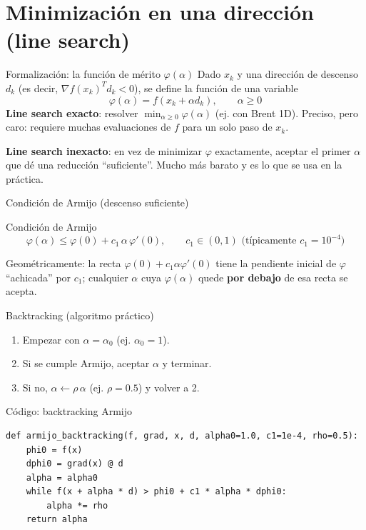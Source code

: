 \documentclass[aspectratio=169]{beamer}
\newcommand{\grad}{\nabla}
\begin{document}
\section{Minimizaci\'on en una direcci\'on (line search)}

\begin{frame}{Formalizaci\'on: la funci\'on de m\'erito $\varphi(\alpha)$}
  Dado $x_k$ y una direcci\'on de descenso $d_k$ (es decir, $\grad f(x_k)^T d_k < 0$), se define la funci\'on de una variable
  \[ \varphi(\alpha) = f(x_k + \alpha d_k), \qquad \alpha \geq 0 \]
  \textbf{Line search exacto}: resolver $\min_{\alpha \geq 0} \varphi(\alpha)$ (ej. con Brent 1D). Preciso, pero caro: requiere muchas evaluaciones de $f$ para un solo paso de $x_k$.

  \textbf{Line search inexacto}: en vez de minimizar $\varphi$ exactamente, aceptar el primer $\alpha$ que d\'e una reducci\'on ``suficiente''. Mucho m\'as barato y es lo que se usa en la pr\'actica.
\end{frame}

\begin{frame}{Condici\'on de Armijo (descenso suficiente)}
  \begin{block}{Condici\'on de Armijo}
    \[ \varphi(\alpha) \leq \varphi(0) + c_1\,\alpha\,\varphi'(0), \qquad c_1 \in (0,1) \text{ (t\'ipicamente } c_1=10^{-4}\text{)} \]
  \end{block}
  Geom\'etricamente: la recta $\varphi(0)+c_1\alpha\varphi'(0)$ tiene la pendiente inicial de $\varphi$ ``achicada'' por $c_1$; cualquier $\alpha$ cuya $\varphi(\alpha)$ quede \textbf{por debajo} de esa recta se acepta.

  \begin{block}{Backtracking (algoritmo pr\'actico)}
    \begin{enumerate}
      \item Empezar con $\alpha = \alpha_0$ (ej. $\alpha_0=1$).
      \item Si se cumple Armijo, aceptar $\alpha$ y terminar.
      \item Si no, $\alpha \leftarrow \rho\,\alpha$ (ej. $\rho=0.5$) y volver a 2.
    \end{enumerate}
  \end{block}
\end{frame}

\begin{frame}[fragile]{C\'odigo: backtracking Armijo}
\begin{lstlisting}
def armijo_backtracking(f, grad, x, d, alpha0=1.0, c1=1e-4, rho=0.5):
    phi0 = f(x)
    dphi0 = grad(x) @ d
    alpha = alpha0
    while f(x + alpha * d) > phi0 + c1 * alpha * dphi0:
        alpha *= rho
    return alpha
\end{lstlisting}
\end{frame}
\end{document}
